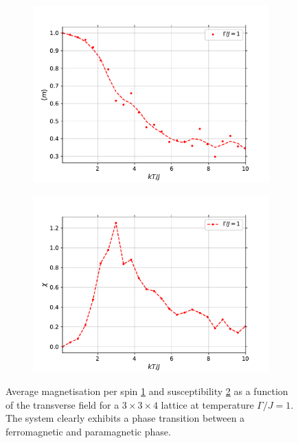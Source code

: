 \documentclass[11pt,openany]{article}
\begin{document}
\begin{figure}[H]
	\centering
	\begin{subfigure}{0.45\textwidth}
		\centering
		\caption{}
		\label{fig:T_m}
		\includegraphics[width=\textwidth]{Plots/T_transition_m.pdf}
	\end{subfigure}
	\begin{subfigure}{0.45\textwidth}
		\centering
		\caption{}
		\label{fig:T_chi}
		\includegraphics[width=\textwidth]{Plots/T_transition_chi.pdf}
	\end{subfigure}
	\caption{Average magnetisation per spin \ref{fig:T_m} and susceptibility \ref{fig:T_chi} as a function of the transverse field for a $3\times3\times4$ lattice at temperature $\Gamma/J=1$. The system clearly exhibits a phase transition between a ferromagnetic and paramagnetic phase.}
	\label{fig:T_transition}
\end{figure}
\end{document}
